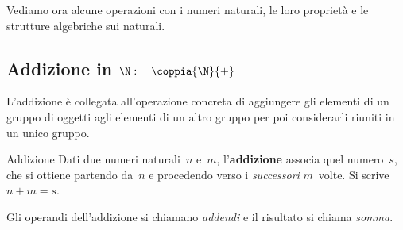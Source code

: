 % 
% 
% 

Vediamo ora alcune operazioni con i numeri naturali, le loro proprietà e le 
strutture algebriche sui naturali.

\subsection{Addizione in 
\texorpdfstring{$\N: \quad \coppia{\N}{+}$}{N: (N; +)}}

L'addizione è collegata all'operazione concreta di aggiungere gli elementi 
di un gruppo di oggetti agli elementi di un altro gruppo per poi 
considerarli riuniti in un unico gruppo.

\begin{definizione}{Addizione}{}
Dati due numeri naturali~\(n\) e~\(m\), l'\textbf{addizione} associa quel 
numero~\(s\), che si ottiene partendo da~\(n\) e procedendo verso i 
\emph{successori} \(m\)~volte. Si scrive~\(n+m=s\).

Gli operandi dell'addizione si chiamano \emph{addendi} e il risultato si 
chiama \emph{somma}.
\end{definizione}

